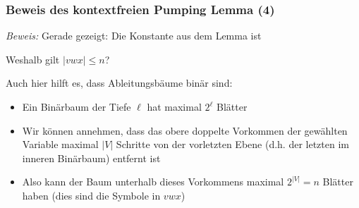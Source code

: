 \documentclass[onlymath]{beamer}
\begin{document}
\begin{frame}[t]\frametitle{Beweis des kontextfreien Pumping Lemma (4)}

\vspace{-1ex}
\medskip

\emph{Beweis:} %
% 
Gerade gezeigt: Die Konstante aus dem Lemma ist 
\medskip

\alert{Weshalb gilt $|vwx|\leq n$?}\pause\medskip

Auch hier hilft es, dass Ableitungsbäume binär sind:
\begin{itemize}
\item Ein Binärbaum der Tiefe $\ell$ hat maximal $2^\ell$ Blätter\pause
\item Wir können annehmen, dass das obere doppelte Vorkommen der gewählten Variable maximal
$|V|$ Schritte von der vorletzten Ebene (d.h. der letzten im inneren Binärbaum) entfernt ist\pause
\item Also kann der Baum unterhalb dieses Vorkommens maximal $2^{|V|}=n$ Blätter haben (dies sind die Symbole in $vwx$)
\end{itemize}

\end{frame}
\end{document}
